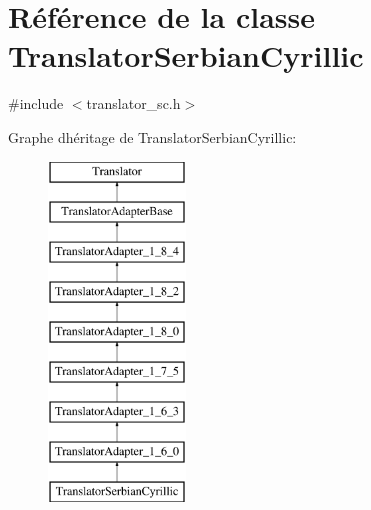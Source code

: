 \hypertarget{class_translator_serbian_cyrillic}{}\section{Référence de la classe Translator\+Serbian\+Cyrillic}
\label{class_translator_serbian_cyrillic}


{\ttfamily \#include $<$translator\+\_\+sc.\+h$>$}

Graphe d\textquotesingle{}héritage de Translator\+Serbian\+Cyrillic\+:\begin{figure}[H]
\begin{center}
\leavevmode
\includegraphics[height=9.000000cm]{class_translator_serbian_cyrillic}
\end{center}
\end{figure}
